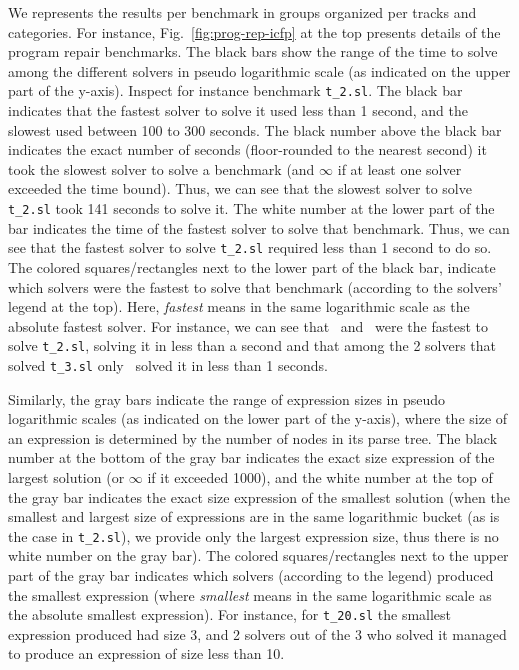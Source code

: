 We represents the results per benchmark in groups organized per tracks and categories. For instance, Fig.~\ref{fig:prog-rep-icfp} at the top presents details of the program repair benchmarks. The black bars show the range of the time to solve among the different solvers in pseudo logarithmic scale (as indicated on the upper part of the y-axis). Inspect for instance benchmark \texttt{t\_2.sl}. The black bar indicates that the fastest solver to solve it used less than 1 second, and the slowest used between 100 to 300 seconds. 
The black number above the black bar indicates the exact number of seconds (floor-rounded to the nearest second) it took the slowest solver to solve a benchmark (and $\infty$ if at least one solver exceeded the time bound). Thus, we can see that the slowest solver to solve \texttt{t\_2.sl} took 141 seconds to solve it. The white number at the lower part of the bar indicates the time of the fastest solver to solve that benchmark. Thus, we can see that the fastest solver to solve \texttt{t\_2.sl} required less than 1 second to do so. The colored squares/rectangles next to the lower part of the black bar, indicate which solvers were the fastest to solve that benchmark (according to the solvers' legend at the top). Here, \emph{fastest} means in the same logarithmic scale as the absolute fastest solver. For instance, we can see that \euphony\ and \eusolvernew\ were the fastest to solve \texttt{t\_2.sl}, solving it in less than a second
and that among the 2 solvers that solved \texttt{t\_3.sl} only \eusolvernew\ solved it in less than 1 seconds. 

Similarly, the gray bars indicate the range of expression sizes in pseudo logarithmic scales (as indicated on the lower part of the y-axis), where the size of an expression is determined by the number of nodes in its parse tree.
The black number at the bottom of the gray bar indicates the exact size expression of the largest solution (or $\infty$ if it exceeded 1000), and the white number at the top of the gray bar indicates the exact size expression of the smallest solution (when the smallest and largest size of expressions are in the same logarithmic bucket (as is the case in \texttt{t\_2.sl}), we provide only the largest expression size, thus there is no white number on the gray bar). The colored squares/rectangles next to the upper part of the gray bar indicates which solvers (according to the legend) produced the smallest expression (where \emph{smallest} means in the same logarithmic scale as the absolute smallest expression). For instance, for \texttt{t\_20.sl} the smallest expression produced had size 3, and 2 solvers out of the 3 who solved it managed to produce an expression of size less than 10.  

